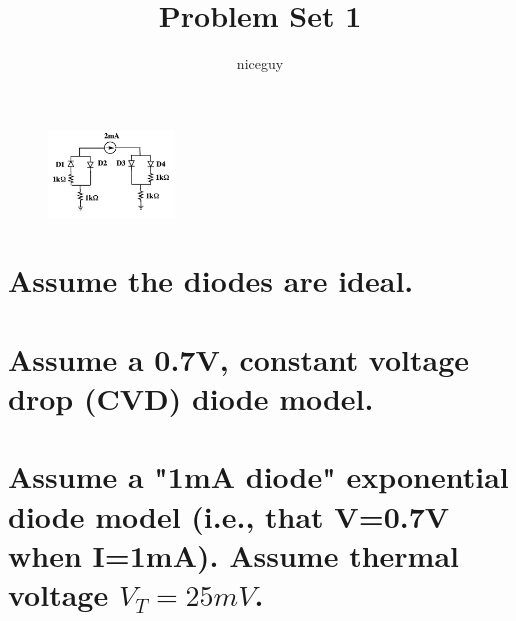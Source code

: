 \documentclass[answers]{exam}
\title{Problem Set 1}
\author{niceguy}
\begin{document}
\maketitle

\begin{questions}


\begin{figure}[h]
    \begin{center}
    \includegraphics[width=0.3\textwidth]{q1.png}
    \end{center}
\end{figure}
    
\begin{parts}
    \part{Assume the diodes are ideal.}
    \part{Assume a 0.7V, constant voltage drop (CVD) diode model.}
    \part{Assume a "1mA diode" exponential diode model (i.e., that V=0.7V when I=1mA). Assume thermal voltage $V_T = 25\unit{mV}$.}
\end{parts}


\end{questions}
\end{document}
